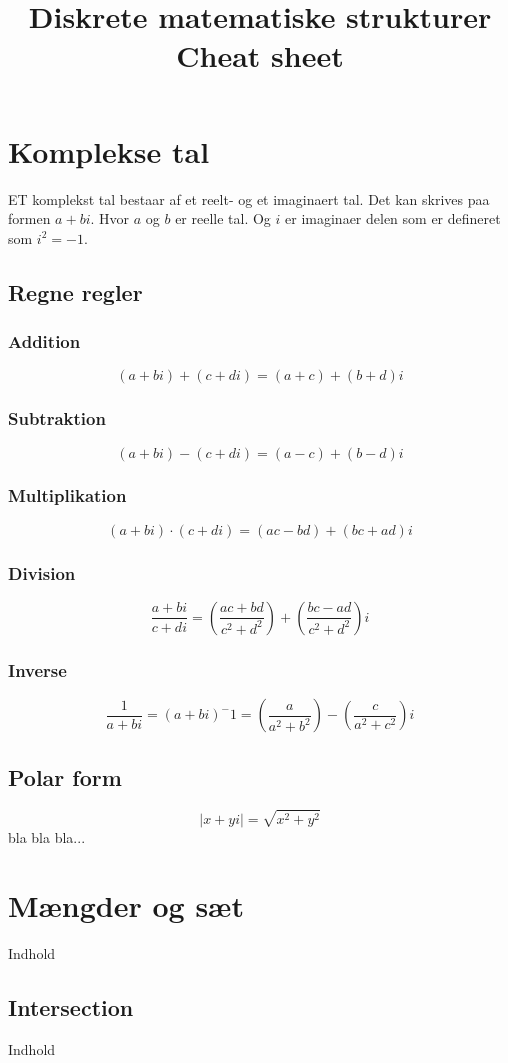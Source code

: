 \documentclass[a4paper]{article}
\title{Diskrete matematiske strukturer\\
          Cheat sheet}
\author {}
\date{}
\begin{document}
\maketitle
\tableofcontents
\clearpage
\section{Komplekse tal}
ET komplekst tal bestaar af et reelt- og et imaginaert tal. Det kan skrives paa formen $a + bi$. Hvor $a$ og $b$ er reelle tal. Og $i$ er imaginaer delen som er defineret som $i^2 = -1$.
 \subsection{Regne regler}
  \subsubsection{Addition}
   $$(a + bi) + (c + di) = (a + c) + (b + d)i$$
  \subsubsection{Subtraktion}
   $$(a + bi) - (c + di) = (a - c) + (b - d)i$$
  \subsubsection{Multiplikation}
   $$(a + bi) \cdot (c + di) = (ac - bd) + (bc + ad)i$$
  \subsubsection{Division}
   $$\frac{a + bi}{c + di} = \left(\frac{ac + bd}{c^2 + d^2}\right) + \left(\frac{bc - ad}{c^2 + d^2}\right)i$$
  \subsubsection{Inverse}
   $$\frac{1}{a + bi} = (a + bi)^-1 = \left(\frac{a}{a^2 + b^2}\right) - \left(\frac{c}{a^2 + c^2}\right)i$$
 \subsection{Polar form}
  $$|x + yi| = \sqrt{x^2 + y^2}$$
  bla bla bla...


\section{Mængder og sæt}
  Indhold
  \subsection{Intersection}
    Indhold
\end{document}
